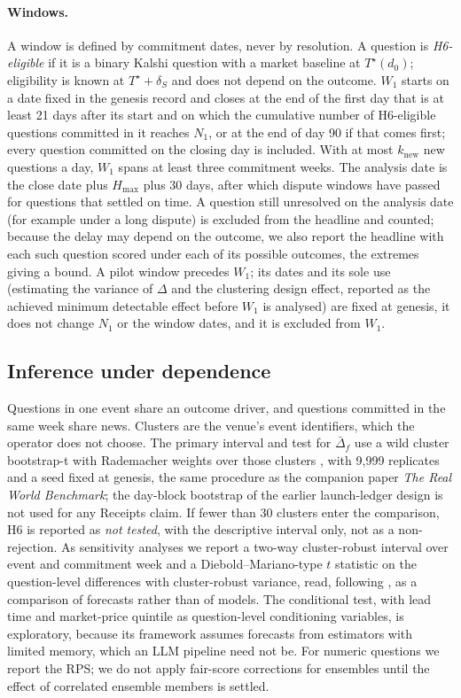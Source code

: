 \documentclass[11pt]{article}
\newcommand{\Ts}{T^{\star}}
\begin{document}
\paragraph{Windows.} A window is defined by commitment dates, never by resolution. A question is \emph{H6-eligible} if it is a binary Kalshi question with a market baseline at $\Ts(d_0)$; eligibility is known at $\Ts + \delta_S$ and does not depend on the outcome. $W_1$ starts on a date fixed in the genesis record and closes at the end of the first day that is at least 21 days after its start and on which the cumulative number of H6-eligible questions committed in it reaches $N_1$, or at the end of day 90 if that comes first; every question committed on the closing day is included. With at most $k_{\mathrm{new}}$ new questions a day, $W_1$ spans at least three commitment weeks. The analysis date is the close date plus $H_{\max}$ plus 30 days, after which dispute windows have passed for questions that settled on time. A question still unresolved on the analysis date (for example under a long dispute) is excluded from the headline and counted; because the delay may depend on the outcome, we also report the headline with each such question scored under each of its possible outcomes, the extremes giving a bound. A pilot window precedes $W_1$; its dates and its sole use (estimating the variance of $\Delta$ and the clustering design effect, reported as the achieved minimum detectable effect before $W_1$ is analysed) are fixed at genesis, it does not change $N_1$ or the window dates, and it is excluded from $W_1$.

\subsection{Inference under dependence}

Questions in one event share an outcome driver, and questions committed in the same week share news. Clusters are the venue's event identifiers, which the operator does not choose. The primary interval and test for $\bar\Delta_f$ use a wild cluster bootstrap-t with Rademacher weights over those clusters \citep{cameron2008bootstrap}, with 9{,}999 replicates and a seed fixed at genesis, the same procedure as the companion paper \emph{The Real World Benchmark}; the day-block bootstrap of the earlier launch-ledger design is not used for any Receipts claim. If fewer than 30 clusters enter the comparison, H6 is reported as \emph{not tested}, with the descriptive interval only, not as a non-rejection. As sensitivity analyses we report a two-way cluster-robust interval over event and commitment week \citep{cameron2011multiway} and a Diebold--Mariano-type $t$ statistic on the question-level differences with cluster-robust variance, read, following \citet{diebold2015}, as a comparison of forecasts rather than of models. The \citet{giacomini2006} conditional test, with lead time and market-price quintile as question-level conditioning variables, is exploratory, because its framework assumes forecasts from estimators with limited memory, which an LLM pipeline need not be. For numeric questions we report the RPS; we do not apply fair-score corrections for ensembles \citep{ferro2014fair} until the effect of correlated ensemble members is settled.
\end{document}
